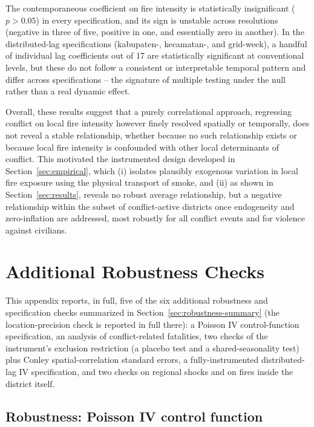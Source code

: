 \documentclass[12pt]{article}
\begin{document}
The contemporaneous coefficient on fire intensity is statistically insignificant ($p > 0.05$) in every specification, and its sign is unstable across resolutions (negative in three of five, positive in one, and essentially zero in another). In the distributed-lag specifications (kabupaten-, kecamatan-, and grid-week), a handful of individual lag coefficients out of 17 are statistically significant at conventional levels, but these do not follow a consistent or interpretable temporal pattern and differ across specifications -- the signature of multiple testing under the null rather than a real dynamic effect.

Overall, these results suggest that a purely correlational approach, regressing conflict on local fire intensity however finely resolved spatially or temporally, does not reveal a stable relationship, whether because no such relationship exists or because local fire intensity is confounded with other local determinants of conflict. This motivated the instrumented design developed in Section~\ref{sec:empirical}, which (i) isolates plausibly exogenous variation in local fire exposure using the physical transport of smoke, and (ii) as shown in Section~\ref{sec:results}, reveals no robust average relationship, but a negative relationship within the subset of conflict-active districts once endogeneity and zero-inflation are addressed, most robustly for all conflict events and for violence against civilians.

\section{Additional Robustness Checks}
\label{sec:appendixrobustness}

This appendix reports, in full, five of the six additional robustness and specification checks summarized in Section~\ref{sec:robustness-summary} (the location-precision check is reported in full there): a Poisson IV control-function specification, an analysis of conflict-related fatalities, two checks of the instrument's exclusion restriction (a placebo test and a shared-seasonality test) plus Conley spatial-correlation standard errors, a fully-instrumented distributed-lag IV specification, and two checks on regional shocks and on fires inside the district itself.

\subsection{Robustness: Poisson IV control function}
\label{sec:poisson}
\end{document}
